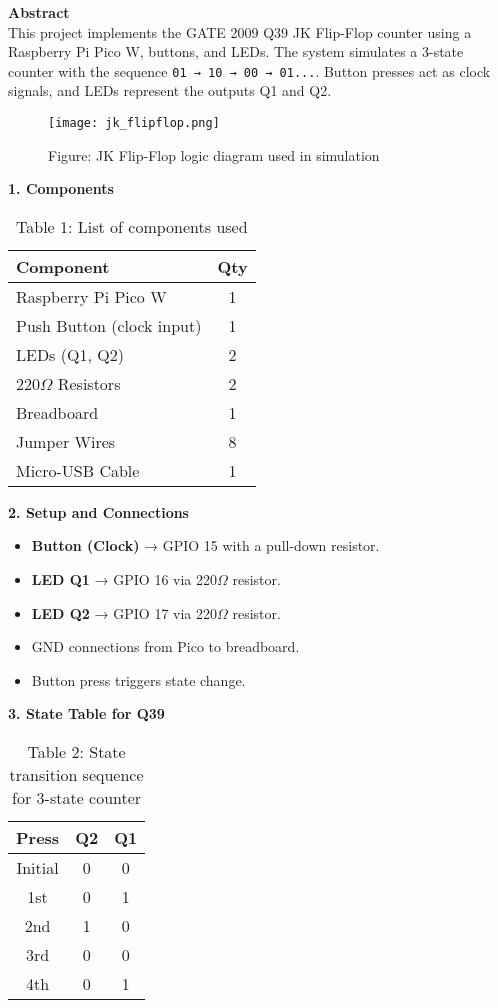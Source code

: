 \documentclass[12pt]{article}
\begin{document}
\begin{multicols}{2}

\noindent\textbf{Abstract} \\[0.5em]
This project implements the GATE 2009 Q39 JK Flip-Flop counter using a Raspberry Pi Pico W, buttons, and LEDs. The system simulates a 3-state counter with the sequence \texttt{01 → 10 → 00 → 01...}. Button presses act as clock signals, and LEDs represent the outputs Q1 and Q2.

\begin{figure}[H]
    \centering
    \texttt{[image: jk\_flipflop.png]} %
    \caption*{Figure: JK Flip-Flop logic diagram used in simulation}
\end{figure}

\vspace{1em}
\noindent\textbf{1. Components}
\begin{table}[H]
\small
\centering
\begin{tabular}{|p{4.2cm}|c|}
\hline
\textbf{Component} & \textbf{Qty} \\
\hline
Raspberry Pi Pico W & 1 \\
Push Button (clock input) & 1 \\
LEDs (Q1, Q2) & 2 \\
220$\Omega$ Resistors & 2 \\
Breadboard & 1 \\
Jumper Wires & 8 \\
Micro-USB Cable & 1 \\
\hline
\end{tabular}
\caption*{Table 1: List of components used}
\end{table}

\vspace{1em}
\noindent\textbf{2. Setup and Connections}
\begin{itemize}
    \item \textbf{Button (Clock)} → GPIO 15 with a pull-down resistor.
    \item \textbf{LED Q1} → GPIO 16 via 220$\Omega$ resistor.
    \item \textbf{LED Q2} → GPIO 17 via 220$\Omega$ resistor.
    \item GND connections from Pico to breadboard.
    \item Button press triggers state change.
\end{itemize}

\vspace{1em}
\noindent\textbf{3. State Table for Q39}
\begin{table}[H]
\centering
\begin{tabular}{|c|c|c|}
\hline
\textbf{Press} & \textbf{Q2} & \textbf{Q1} \\
\hline
Initial & 0 & 0 \\
1st & 0 & 1 \\
2nd & 1 & 0 \\
3rd & 0 & 0 \\
4th & 0 & 1 \\
\hline
\end{tabular}
\caption*{Table 2: State transition sequence for 3-state counter}
\end{table}


\end{multicols}
\end{document}
